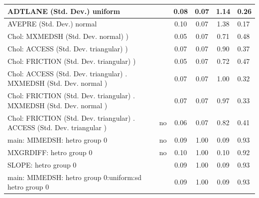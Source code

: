 \begin{table}
\begin{center}
\begin{tabular}{|l|l|c|c|c|l|}
			\hline
			ADTLANE (Std. Dev.) uniform &  & 0.08 & 0.07 & 1.14 & 0.26 \\
			\hline
			AVEPRE (Std. Dev.) normal &  & 0.10 & 0.07 & 1.38 & 0.17 \\
			\hline
			 Chol: MXMEDSH (Std. Dev. normal) ) &  & 0.05 & 0.07 & 0.71 & 0.48 \\
			\hline
			 Chol: ACCESS (Std. Dev. triangular) ) &  & 0.07 & 0.07 & 0.90 & 0.37 \\
			\hline
			 Chol: FRICTION (Std. Dev. triangular) ) &  & 0.05 & 0.07 & 0.72 & 0.47 \\
			\hline
			 Chol: ACCESS (Std. Dev. triangular) . MXMEDSH (Std. Dev.   normal ) &  & 0.07 & 0.07 & 1.00 & 0.32 \\
			\hline
			 Chol: FRICTION (Std. Dev. triangular) . MXMEDSH (Std. Dev.   normal ) &  & 0.07 & 0.07 & 0.97 & 0.33 \\
			\hline
			 Chol: FRICTION (Std. Dev. triangular) . ACCESS (Std. Dev.   triangular ) & no & 0.06 & 0.07 & 0.82 & 0.41 \\
			\hline
			main: MIMEDSH: hetro group 0 & no & 0.09 & 1.00 & 0.09 & 0.93 \\
			\hline
			MXGRDIFF: hetro group 0 & no & 0.10 & 1.00 & 0.10 & 0.92 \\
			\hline
			SLOPE: hetro group 0 &  & 0.09 & 1.00 & 0.09 & 0.93 \\
			\hline
			main: MIMEDSH: hetro group 0:uniform:sd  hetro group 0 &  & 0.09 & 1.00 & 0.09 & 0.93 \\
			\hline
		\end{tabular}
	\end{center}
\end{table}